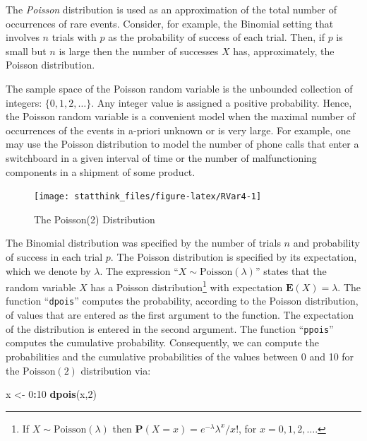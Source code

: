 \documentclass[]{krantz}
\makeatletter
\newenvironment{Shaded}{\begin{snugshade}}{\end{snugshade}}
\newcommand{\DecValTok}[1]{\textcolor[rgb]{0.00,0.00,0.81}{#1}}
\newcommand{\KeywordTok}[1]{\textcolor[rgb]{0.13,0.29,0.53}{\textbf{#1}}}
\newcommand{\NormalTok}[1]{#1}
\newcommand{\OperatorTok}[1]{\textcolor[rgb]{0.81,0.36,0.00}{\textbf{#1}}}
\newcommand{\StringTok}[1]{\textcolor[rgb]{0.31,0.60,0.02}{#1}}
\newcommand{\Expec}{\mathbf{E}}
\newcommand{\Prob}{\mathbf{P}}
\newenvironment{kframe}{%
\medskip{}
\setlength{\fboxsep}{.8em}
 \def\at@end@of@kframe{}%
 \ifinner\ifhmode%
  \def\at@end@of@kframe{\end{minipage}}%
  \begin{minipage}{\columnwidth}%
 \fi\fi%
 \def\FrameCommand##1{\hskip\@totalleftmargin \hskip-\fboxsep
 \colorbox{shadecolor}{##1}\hskip-\fboxsep
     \hskip-\linewidth \hskip-\@totalleftmargin \hskip\columnwidth}%
 \MakeFramed {\advance\hsize-\width
   \@totalleftmargin\z@ \linewidth\hsize
   \@setminipage}}%
 {\par\unskip\endMakeFramed%
 \at@end@of@kframe}
\renewenvironment{Shaded}{\begin{kframe}}{\end{kframe}}
\theoremstyle{definition}
\theoremstyle{definition}
\theoremstyle{definition}
\theoremstyle{remark}
\makeatother
\begin{document}
The \emph{Poisson} distribution is used as an approximation of the total
number of occurrences of rare events. Consider, for example, the
Binomial setting that involves \(n\) trials with \(p\) as the probability of
success of each trial. Then, if \(p\) is small but \(n\) is large then the
number of successes \(X\) has, approximately, the Poisson distribution.

The sample space of the Poisson random variable is the unbounded
collection of integers: \(\{0,1,2, \ldots\}\). Any integer value is
assigned a positive probability. Hence, the Poisson random variable is a
convenient model when the maximal number of occurrences of the events in
a-priori unknown or is very large. For example, one may use the Poisson
distribution to model the number of phone calls that enter a switchboard
in a given interval of time or the number of malfunctioning components
in a shipment of some product.

\begin{figure}

{\centering \texttt{[image: statthink\_files/figure-latex/RVar4-1]} 

}

\caption{The Poisson(2) Distribution}\label{fig:RVar4}
\end{figure}

The Binomial distribution was specified by the number of trials \(n\) and
probability of success in each trial \(p\). The Poisson distribution is
specified by its expectation, which we denote by \(\lambda\). The
expression ``\(X \sim \mathrm{Poisson}(\lambda)\)'' states that the random
variable \(X\) has a Poisson distribution\footnote{If \(X \sim \mathrm{Poisson}(\lambda)\) then
  \(\Prob(X=x) = e^{-\lambda}\lambda^x/x!\), for \(x=0,1,2,\ldots\).} with expectation
\(\Expec(X) = \lambda\). The function ``\texttt{dpois}'' computes the probability,
according to the Poisson distribution, of values that are entered as the
first argument to the function. The expectation of the distribution is
entered in the second argument. The function ``\texttt{ppois}'' computes the
cumulative probability. Consequently, we can compute the probabilities
and the cumulative probabilities of the values between 0 and 10 for the
\(\mathrm{Poisson}(2)\) distribution via:

\begin{Shaded}
\begin{Highlighting}[]
\NormalTok{x <-}\StringTok{ }\DecValTok{0}\OperatorTok{:}\DecValTok{10}
\KeywordTok{dpois}\NormalTok{(x,}\DecValTok{2}\NormalTok{)}
\end{Highlighting}
\end{Shaded}
\end{document}
